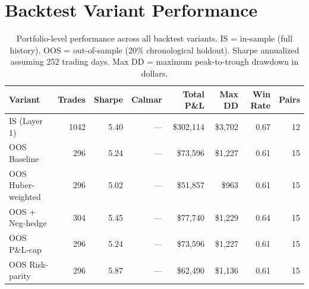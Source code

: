 \documentclass[12pt,a4paper]{article}
\begin{document}
\section{Backtest Variant Performance}
\begin{table}[htbp]
\centering
\small
\caption{Portfolio-level performance across all backtest variants. IS = in-sample (full history). OOS = out-of-sample (20\% chronological holdout). Sharpe annualized assuming 252 trading days. Max DD = maximum peak-to-trough drawdown in dollars.}
\label{tab:perf_variants}
\begin{tabular}{lrrrrrrr}
\toprule
Variant & Trades & Sharpe & Calmar & Total P\&L & Max DD & Win Rate & Pairs \\
\midrule
IS (Layer 1) & 1042 & 5.40 & --- & \$302,114 & \$3,702 & 0.67 & 12 \\
OOS Baseline & 296 & 5.24 & --- & \$73,596 & \$1,227 & 0.61 & 15 \\
OOS Huber-weighted & 296 & 5.02 & --- & \$51,857 & \$963 & 0.61 & 15 \\
OOS + Neg-hedge & 304 & 5.45 & --- & \$77,740 & \$1,229 & 0.64 & 15 \\
OOS P\&L-cap & 296 & 5.24 & --- & \$73,596 & \$1,227 & 0.61 & 15 \\
OOS Risk-parity & 296 & 5.87 & --- & \$62,490 & \$1,136 & 0.61 & 15 \\
\bottomrule
\end{tabular}
\end{table}
\end{document}
